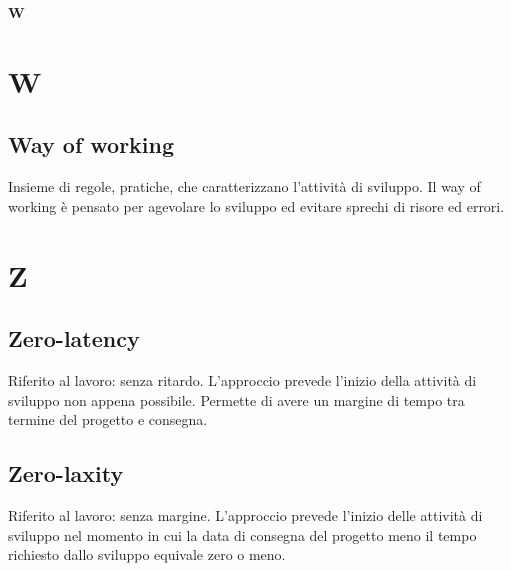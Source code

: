 	{\Huge{\textbf{W}}} \\
	\section{W}
	
	\subsection{Way of working}
	\label{sec:wow}
	Insieme di regole, pratiche, che caratterizzano l'attività di sviluppo. Il way of working è pensato per agevolare lo sviluppo ed evitare sprechi di risore ed errori. \newpage

	
	\section{Z}
	
	\subsection{Zero-latency}
	\label{sec:zerolatency}
	Riferito al lavoro: senza ritardo. L'approccio prevede l'inizio della attività di sviluppo non appena possibile. Permette di avere un margine di tempo tra termine del progetto e consegna.
	
	\subsection{Zero-laxity}
	\label{sec:zerolaxity}
	Riferito al lavoro: senza margine. L'approccio prevede l'inizio delle attività di sviluppo nel momento in cui la data di consegna del progetto meno il tempo richiesto dallo sviluppo equivale zero o meno. 
